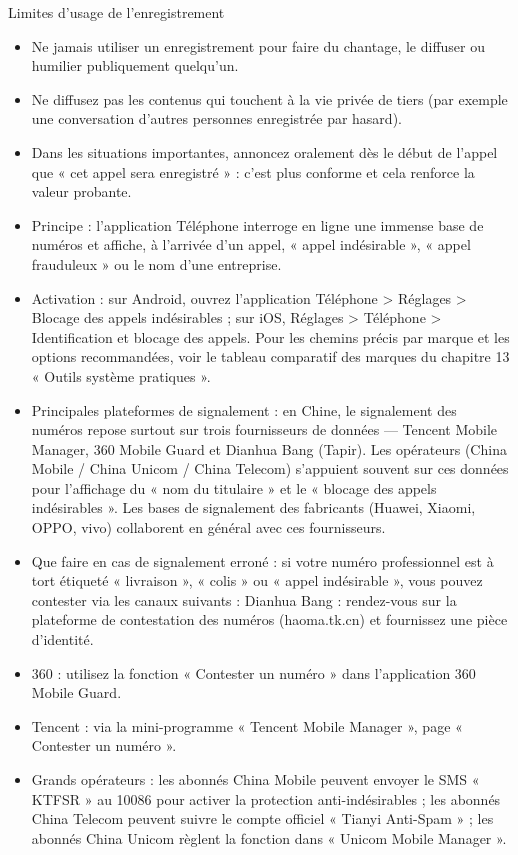 \begin{tcbwarn}{Limites d'usage de l'enregistrement}
\begin{itemize}
  \item Ne jamais utiliser un enregistrement pour faire du chantage, le diffuser ou humilier publiquement quelqu'un.
  \item Ne diffusez pas les contenus qui touchent à la vie privée de tiers (par exemple une conversation d'autres personnes enregistrée par hasard).
  \item Dans les situations importantes, annoncez oralement dès le début de l'appel que « cet appel sera enregistré » : c'est plus conforme et cela renforce la valeur probante.
\end{itemize}

\end{tcbwarn}


\begin{itemize}
  \item Principe : l'application Téléphone interroge en ligne une immense base de numéros et affiche, à l'arrivée d'un appel, « appel indésirable », « appel frauduleux » ou le nom d'une entreprise.
  \item Activation : sur Android, ouvrez l'application Téléphone > Réglages > Blocage des appels indésirables ; sur iOS, Réglages > Téléphone > Identification et blocage des appels. Pour les chemins précis par marque et les options recommandées, voir le tableau comparatif des marques du chapitre 13 « Outils système pratiques ».
  \item Principales plateformes de signalement : en Chine, le signalement des numéros repose surtout sur trois fournisseurs de données — Tencent Mobile Manager, 360 Mobile Guard et Dianhua Bang (Tapir). Les opérateurs (China Mobile / China Unicom / China Telecom) s'appuient souvent sur ces données pour l'affichage du « nom du titulaire » et le « blocage des appels indésirables ». Les bases de signalement des fabricants (Huawei, Xiaomi, OPPO, vivo) collaborent en général avec ces fournisseurs.
  \item Que faire en cas de signalement erroné : si votre numéro professionnel est à tort étiqueté « livraison », « colis » ou « appel indésirable », vous pouvez contester via les canaux suivants : Dianhua Bang : rendez-vous sur la plateforme de contestation des numéros (haoma.tk.cn) et fournissez une pièce d'identité.
  \item 360 : utilisez la fonction « Contester un numéro » dans l'application 360 Mobile Guard.
  \item Tencent : via la mini-programme « Tencent Mobile Manager », page « Contester un numéro ».
  \item Grands opérateurs : les abonnés China Mobile peuvent envoyer le SMS « KTFSR » au 10086 pour activer la protection anti-indésirables ; les abonnés China Telecom peuvent suivre le compte officiel « Tianyi Anti-Spam » ; les abonnés China Unicom règlent la fonction dans « Unicom Mobile Manager ».
\end{itemize}

